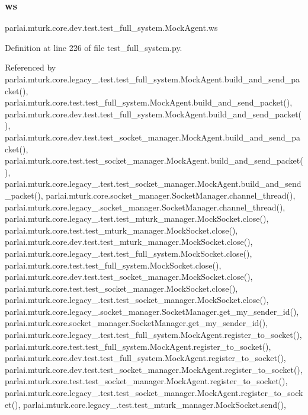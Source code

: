 \subsubsection{\texorpdfstring{ws}{ws}}
{\footnotesize\ttfamily parlai.\+mturk.\+core.\+dev.\+test.\+test\+\_\+full\+\_\+system.\+Mock\+Agent.\+ws}



Definition at line 226 of file test\+\_\+full\+\_\+system.\+py.



Referenced by parlai.\+mturk.\+core.\+legacy\+\_.\+test.\+test\+\_\+full\+\_\+system.\+Mock\+Agent.\+build\+\_\+and\+\_\+send\+\_\+packet(), parlai.\+mturk.\+core.\+test.\+test\+\_\+full\+\_\+system.\+Mock\+Agent.\+build\+\_\+and\+\_\+send\+\_\+packet(), parlai.\+mturk.\+core.\+dev.\+test.\+test\+\_\+full\+\_\+system.\+Mock\+Agent.\+build\+\_\+and\+\_\+send\+\_\+packet(), parlai.\+mturk.\+core.\+dev.\+test.\+test\+\_\+socket\+\_\+manager.\+Mock\+Agent.\+build\+\_\+and\+\_\+send\+\_\+packet(), parlai.\+mturk.\+core.\+test.\+test\+\_\+socket\+\_\+manager.\+Mock\+Agent.\+build\+\_\+and\+\_\+send\+\_\+packet(), parlai.\+mturk.\+core.\+legacy\+\_.\+test.\+test\+\_\+socket\+\_\+manager.\+Mock\+Agent.\+build\+\_\+and\+\_\+send\+\_\+packet(), parlai.\+mturk.\+core.\+socket\+\_\+manager.\+Socket\+Manager.\+channel\+\_\+thread(), parlai.\+mturk.\+core.\+legacy\+\_.\+socket\+\_\+manager.\+Socket\+Manager.\+channel\+\_\+thread(), parlai.\+mturk.\+core.\+legacy\+\_.\+test.\+test\+\_\+mturk\+\_\+manager.\+Mock\+Socket.\+close(), parlai.\+mturk.\+core.\+test.\+test\+\_\+mturk\+\_\+manager.\+Mock\+Socket.\+close(), parlai.\+mturk.\+core.\+dev.\+test.\+test\+\_\+mturk\+\_\+manager.\+Mock\+Socket.\+close(), parlai.\+mturk.\+core.\+legacy\+\_.\+test.\+test\+\_\+full\+\_\+system.\+Mock\+Socket.\+close(), parlai.\+mturk.\+core.\+test.\+test\+\_\+full\+\_\+system.\+Mock\+Socket.\+close(), parlai.\+mturk.\+core.\+dev.\+test.\+test\+\_\+socket\+\_\+manager.\+Mock\+Socket.\+close(), parlai.\+mturk.\+core.\+test.\+test\+\_\+socket\+\_\+manager.\+Mock\+Socket.\+close(), parlai.\+mturk.\+core.\+legacy\+\_.\+test.\+test\+\_\+socket\+\_\+manager.\+Mock\+Socket.\+close(), parlai.\+mturk.\+core.\+legacy\+\_.\+socket\+\_\+manager.\+Socket\+Manager.\+get\+\_\+my\+\_\+sender\+\_\+id(), parlai.\+mturk.\+core.\+socket\+\_\+manager.\+Socket\+Manager.\+get\+\_\+my\+\_\+sender\+\_\+id(), parlai.\+mturk.\+core.\+legacy\+\_.\+test.\+test\+\_\+full\+\_\+system.\+Mock\+Agent.\+register\+\_\+to\+\_\+socket(), parlai.\+mturk.\+core.\+test.\+test\+\_\+full\+\_\+system.\+Mock\+Agent.\+register\+\_\+to\+\_\+socket(), parlai.\+mturk.\+core.\+dev.\+test.\+test\+\_\+full\+\_\+system.\+Mock\+Agent.\+register\+\_\+to\+\_\+socket(), parlai.\+mturk.\+core.\+dev.\+test.\+test\+\_\+socket\+\_\+manager.\+Mock\+Agent.\+register\+\_\+to\+\_\+socket(), parlai.\+mturk.\+core.\+test.\+test\+\_\+socket\+\_\+manager.\+Mock\+Agent.\+register\+\_\+to\+\_\+socket(), parlai.\+mturk.\+core.\+legacy\+\_.\+test.\+test\+\_\+socket\+\_\+manager.\+Mock\+Agent.\+register\+\_\+to\+\_\+socket(), parlai.\+mturk.\+core.\+legacy\+\_.\+test.\+test\+\_\+mturk\+\_\+manager.\+Mock\+Socket.\+send(), 